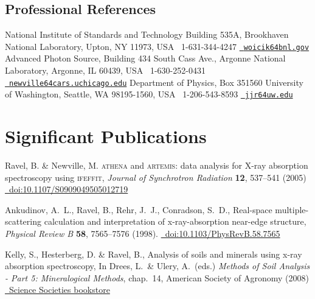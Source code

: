 \documentclass[11pt]{moderncv}
\begin{document}
\subsection{Professional References}
%
{National Institute of Standards and Technology\newline
  Building 535A, Brookhaven National Laboratory, Upton, NY 11973, USA\newline
  \phonesymbol\ 1-631-344-4247\quad
  \href{mailto:woicik@bnl.gov}{\emailsymbol\ \footnotesize\texttt{woicik\char64bnl.gov}}}
%
{Advanced Photon Source, Building 434 South Cass Ave., Argonne National Laboratory, Argonne, IL 60439, USA\newline
  \phonesymbol\ 1-630-252-0431\quad
  \href{mailto:newville@cars.uchicago.edu}
  {\emailsymbol\ \footnotesize\texttt{newville\char64cars.uchicago.edu}}}
%
{Department of Physics, Box 351560\newline
  University of Washington, Seattle, WA 98195-1560, USA\newline
  \phonesymbol\ 1-206-543-8593\quad
  \href{mailto:jjr@uw.edu}{\emailsymbol\ \footnotesize\texttt{jjr\char64uw.edu}}}

\section{Significant Publications}
\label{sec:highlights}

%
{\small Ravel, B. \& Newville, M. \textsc{athena} and
  \textsc{artemis}: data analysis for X-ray absorption spectroscopy
  using \textsc{ifeffit}, \emph{Journal of Synchrotron Radiation}
  \textbf{12}, 537--541 (2005)
  \href{http://dx.doi.org/10.1107/S0909049505012719}
  {\color{color2}\homepagesymbol~doi:10.1107/S0909049505012719}}

%
{\small Ankudinov, A.~L., Ravel, B., Rehr, J.~J., Conradson, S.~D.,
  Real-space multiple-scattering calculation and interpretation of
  x-ray-absorption near-edge structure, \emph{Physical Review B}
  \textbf{58}, 7565--7576 (1998).
  \href{http://dx.doi.org/10.1103/PhysRevB.58.7565}
  {\color{color2}\homepagesymbol~doi:10.1103/PhysRevB.58.7565}}

%
{\small Kelly, S., Hesterberg, D. \& Ravel, B., Analysis of soils and
  minerals using x-ray absorption spectroscopy, In Drees, L.\ \&
  Ulery, A.\ (eds.)  \emph{Methods of Soil Analysis - Part 5:
    Mineralogical Methods}, chap.~14, American Society of Agronomy
  (2008)
  \href{https://portal.sciencesocieties.org/Purchase/ProductDetail.aspx?Product_code=802f0511-76f0-dc11-b6b8-0013210e308c}
  {\color{color2}\homepagesymbol~Science Societies bookstore}}



\nocite{*}


\end{document}
